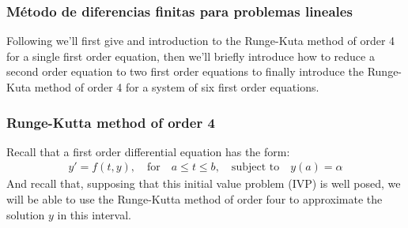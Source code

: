 \documentclass[12pt,twoside]{extarticle}
\begin{document}
\subsubsection{Método de diferencias finitas para problemas lineales}
Following \cite[Chapter 5 Initial-Value Problems for Ordinary Differential Equations, p. 259]{burden} we'll first give and introduction to the Runge-Kuta method of order 4 for a single first order equation, then we'll briefly introduce how to reduce a second order equation to two first order equations to finally introduce the Runge-Kuta method of order 4 for a system of six first order equations.

\subsubsection{Runge-Kutta method of order 4}
    Recall that a first order differential equation has the form:
    \begin{align*}
        y'=f(t,y), \quad \text{for} \quad a \leq t \leq b, \quad \text{subject to} \quad y(a)=\alpha
    \end{align*}
    And recall that,
    supposing that this initial value problem (IVP) is well posed, we will be able to use the Runge-Kutta method of order four to approximate the solution $y$ in this interval.
    
\end{document}
